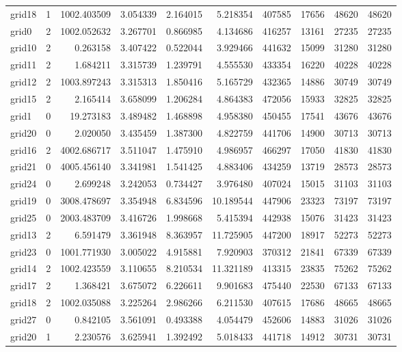 \begin{longtable}{|l|r|r|r|r|r|r|r|r|r|}
grid18 & 1 & 1002.403509 & 3.054339 & 2.164015 & 5.218354 & 407585 & 17656 & 48620 & 48620 \\
grid0 & 2 & 1002.052632 & 3.267701 & 0.866985 & 4.134686 & 416257 & 13161 & 27235 & 27235 \\
grid10 & 2 & 0.263158 & 3.407422 & 0.522044 & 3.929466 & 441632 & 15099 & 31280 & 31280 \\
grid11 & 2 & 1.684211 & 3.315739 & 1.239791 & 4.555530 & 433354 & 16220 & 40228 & 40228 \\
grid12 & 2 & 1003.897243 & 3.315313 & 1.850416 & 5.165729 & 432365 & 14886 & 30749 & 30749 \\
grid15 & 2 & 2.165414 & 3.658099 & 1.206284 & 4.864383 & 472056 & 15933 & 32825 & 32825 \\
grid1 & 0 & 19.273183 & 3.489482 & 1.468898 & 4.958380 & 450455 & 17541 & 43676 & 43676 \\
grid20 & 0 & 2.020050 & 3.435459 & 1.387300 & 4.822759 & 441706 & 14900 & 30713 & 30713 \\
grid16 & 2 & 4002.686717 & 3.511047 & 1.475910 & 4.986957 & 466297 & 17050 & 41830 & 41830 \\
grid21 & 0 & 4005.456140 & 3.341981 & 1.541425 & 4.883406 & 434259 & 13719 & 28573 & 28573 \\
grid24 & 0 & 2.699248 & 3.242053 & 0.734427 & 3.976480 & 407024 & 15015 & 31103 & 31103 \\
grid19 & 0 & 3008.478697 & 3.354948 & 6.834596 & 10.189544 & 447906 & 23323 & 73197 & 73197 \\
grid25 & 0 & 2003.483709 & 3.416726 & 1.998668 & 5.415394 & 442938 & 15076 & 31423 & 31423 \\
grid13 & 2 & 6.591479 & 3.361948 & 8.363957 & 11.725905 & 447200 & 18917 & 52273 & 52273 \\
grid23 & 0 & 1001.771930 & 3.005022 & 4.915881 & 7.920903 & 370312 & 21841 & 67339 & 67339 \\
grid14 & 2 & 1002.423559 & 3.110655 & 8.210534 & 11.321189 & 413315 & 23835 & 75262 & 75262 \\
grid17 & 2 & 1.368421 & 3.675072 & 6.226611 & 9.901683 & 475440 & 22530 & 67133 & 67133 \\
grid18 & 2 & 1002.035088 & 3.225264 & 2.986266 & 6.211530 & 407615 & 17686 & 48665 & 48665 \\
grid27 & 0 & 0.842105 & 3.561091 & 0.493388 & 4.054479 & 452606 & 14883 & 31026 & 31026 \\
grid20 & 1 & 2.230576 & 3.625941 & 1.392492 & 5.018433 & 441718 & 14912 & 30731 & 30731 \\

\end{longtable}
